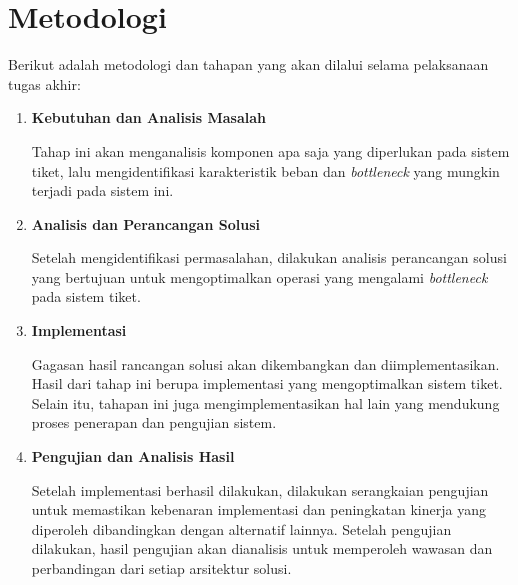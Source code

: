 \section{Metodologi}

Berikut adalah metodologi dan tahapan yang akan dilalui selama pelaksanaan tugas akhir:

\begin{enumerate}
      \item \textbf{Kebutuhan dan Analisis Masalah}

            Tahap ini akan menganalisis komponen apa saja yang diperlukan pada sistem tiket, lalu mengidentifikasi karakteristik beban dan \textit{bottleneck} yang mungkin terjadi pada sistem ini.

      \item \textbf{Analisis dan Perancangan Solusi}

            Setelah mengidentifikasi permasalahan, dilakukan analisis perancangan solusi yang bertujuan untuk mengoptimalkan operasi yang mengalami \textit{bottleneck} pada sistem tiket.

            \pagebreak

      \item \textbf{Implementasi}

            Gagasan hasil rancangan solusi akan dikembangkan dan diimplementasikan. Hasil dari tahap ini berupa implementasi yang mengoptimalkan sistem tiket. Selain itu, tahapan ini juga mengimplementasikan hal lain yang mendukung proses penerapan dan pengujian sistem.

      \item \textbf{Pengujian dan Analisis Hasil}

            Setelah implementasi berhasil dilakukan, dilakukan serangkaian pengujian untuk memastikan kebenaran implementasi dan peningkatan kinerja yang diperoleh dibandingkan dengan alternatif lainnya. Setelah pengujian dilakukan, hasil pengujian akan dianalisis untuk memperoleh wawasan dan perbandingan dari setiap arsitektur solusi.

\end{enumerate}